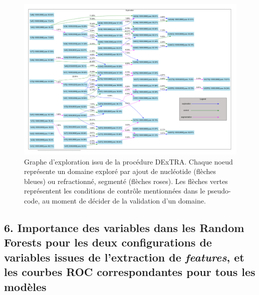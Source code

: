 \documentclass[french]{llncs}
\begin{document}
\begin{figure}[h]
\begin{center}
 	\includegraphics[width=1\linewidth]{Images_Dextra/exploration_graph.png}
 \caption{Graphe d'exploration issu de la procédure DExTRA. Chaque noeud représente un domaine exploré par ajout de nucléotide (flèches bleues) ou refractionné, segmenté (flèches roses). Les flèches vertes représentent les conditions de contrôle mentionnées dans le pseudo-code, au moment de décider de la validation d'un domaine. } \label{fig:explo}
\end{center}
\end{figure}




\subsection*{6. Importance des variables dans les Random Forests pour les deux configurations de variables issues de l'extraction de \textit{features}, et les courbes ROC correspondantes pour tous les modèles}
\end{document}
